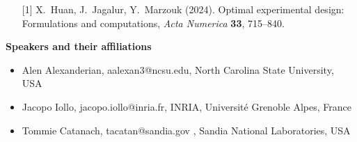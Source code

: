 \begin{talk}
\medskip

\begin{enumerate}
	\item[{[1]}] X.\ Huan, J.\ Jagalur, Y.\ Marzouk (2024). Optimal experimental design: Formulations and computations, \textit{Acta Numerica} \textbf{33}, 715--840.
\end{enumerate}


\textbf{Speakers and their affiliations}

\begin{itemize}
\item Alen Alexanderian,  aalexan3@ncsu.edu, North Carolina State University, USA

\item Jacopo Iollo, jacopo.iollo@inria.fr, INRIA, Universit\'e Grenoble Alpes, France

\item Tommie Catanach, tacatan@sandia.gov , Sandia National Laboratories, USA

\end{itemize}

\end{talk}

